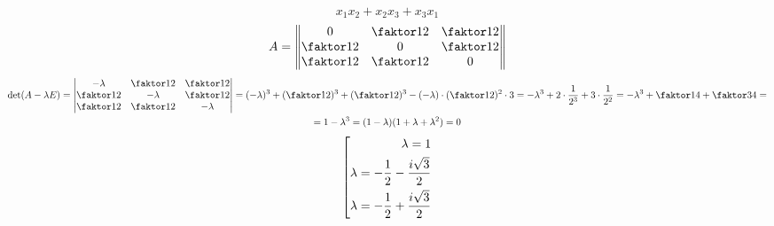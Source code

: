 $$ x_1x_2 + x_2x_3 + x_3x_1 $$
$$ A =
\begin{Vmatrix}
	0 & \faktor12 & \faktor12 \\
    \faktor12 & 0 & \faktor12 \\
    \faktor12 & \faktor12 & 0
\end{Vmatrix} $$
\begin{multline*}
	\det(A - \lambda E) =
    \begin{vmatrix}
    	-\lambda & \faktor12 & \faktor12 \\
        \faktor12 & -\lambda & \faktor12 \\
        \faktor12 & \faktor12 & -\lambda
    \end{vmatrix} = (-\lambda)^3 + (\faktor12)^3 + (\faktor12)^3 - (-\lambda) \cdot (\faktor12)^2 \cdot 3 = -\lambda^3 + 2 \cdot \frac1{2^3} + 3 \cdot \frac1{2^2} = -\lambda^3 + \faktor14 + \faktor34 = \\
    = 1 - \lambda^3 = (1 - \lambda)(1 + \lambda + \lambda^2) = 0
\end{multline*}
$$ \left[
\begin{aligned}
	\lambda = 1 \\
    \lambda = -\half - \half[i\sqrt3] \\
    \lambda = -\half + \half[i\sqrt3]
\end{aligned} \right. $$

